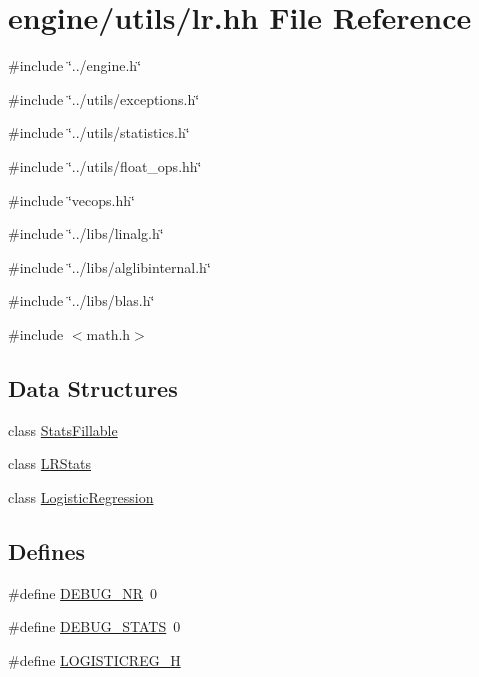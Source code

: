 \hypertarget{lr_8hh}{
\section{engine/utils/lr.hh File Reference}
\label{lr_8hh}
}
{\ttfamily \#include \char`\"{}../engine.h\char`\"{}}\par
{\ttfamily \#include \char`\"{}../utils/exceptions.h\char`\"{}}\par
{\ttfamily \#include \char`\"{}../utils/statistics.h\char`\"{}}\par
{\ttfamily \#include \char`\"{}../utils/float\_\-ops.hh\char`\"{}}\par
{\ttfamily \#include \char`\"{}vecops.hh\char`\"{}}\par
{\ttfamily \#include \char`\"{}../libs/linalg.h\char`\"{}}\par
{\ttfamily \#include \char`\"{}../libs/alglibinternal.h\char`\"{}}\par
{\ttfamily \#include \char`\"{}../libs/blas.h\char`\"{}}\par
{\ttfamily \#include $<$math.h$>$}\par
\subsection*{Data Structures}
\begin{DoxyCompactItemize}
\item 
class \hyperlink{classStatsFillable}{StatsFillable}
\item 
class \hyperlink{classLRStats}{LRStats}
\item 
class \hyperlink{classLogisticRegression}{LogisticRegression}
\end{DoxyCompactItemize}
\subsection*{Defines}
\begin{DoxyCompactItemize}
\item 
\#define \hyperlink{lr_8hh_a0282c129efbe63bb2e3358602d69b680}{DEBUG\_\-NR}~0
\item 
\#define \hyperlink{lr_8hh_af37dddc82c37151b47b31f10ff3a0e65}{DEBUG\_\-STATS}~0
\item 
\#define \hyperlink{lr_8hh_a16e471ed181626938449f38642992bb0}{LOGISTICREG\_\-H}
\end{DoxyCompactItemize}


